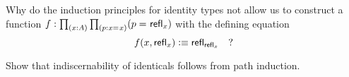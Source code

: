 \begin{ex}\label{ex:without-K}
  Why do the induction principles for identity types not allow us to construct a function $f: \prd{x:A}{p:\id{x}{x}} (\id{p}{\refl{x}})$ with the defining equation
  \[ f(x,\mathsf{refl}_{x}) \vcentcolon\equiv \mathsf{refl}_{\mathsf{refl}_{x}} \quad ?\]
\end{ex}

\begin{ex}\label{ex:subtFromPathInd}
  Show that indiscernability of identicals follows from path induction.  
\end{ex}


